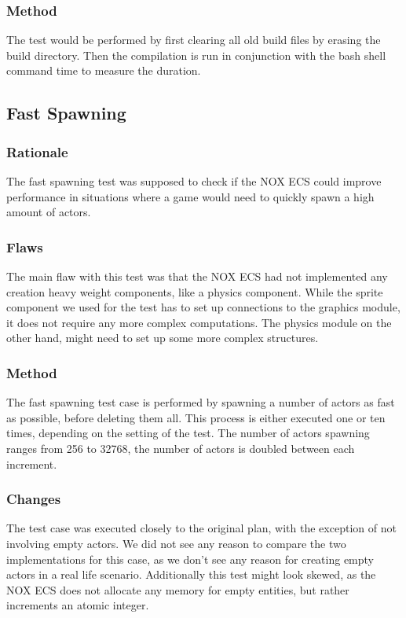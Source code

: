 \subsubsection{Method}
The test would be performed by first clearing all old build files by erasing the build directory.
Then the compilation is run in conjunction with the bash shell command time to measure the duration.

\subsection{Fast Spawning}
\label{subsec:test_cases_fast_spawning}
\subsubsection{Rationale}
The fast spawning test was supposed to check if the NOX ECS could improve performance in situations where a game would need to quickly
spawn a high amount of actors.

\subsubsection{Flaws}
The main flaw with this test was that the NOX ECS had not implemented any creation heavy weight components, like a physics component.
While the sprite component we used for the test has to set up connections to the graphics module, it does not require any more complex
computations. The physics module on the other hand, might need to set up some more complex structures.

\subsubsection{Method}
\label{subsubsec:test_cases_fast_spawning_method}
The fast spawning test case is performed by spawning a number of actors as fast as possible, before deleting them all.
This process is either executed one or ten times, depending on the setting of the test.
The number of actors spawning ranges from 256 to 32768, the number of actors is doubled between each increment.

\subsubsection{Changes}
\label{subsubsec:test_cases_fast_spawning_changes}
The test case was executed closely to the original plan, with the exception of not involving empty actors.
We did not see any reason to compare the two implementations for this case, as we don't see any reason for creating empty actors in a real life scenario.
Additionally this test might look skewed, as the NOX ECS does not allocate any memory for empty entities, but rather increments an atomic integer.

